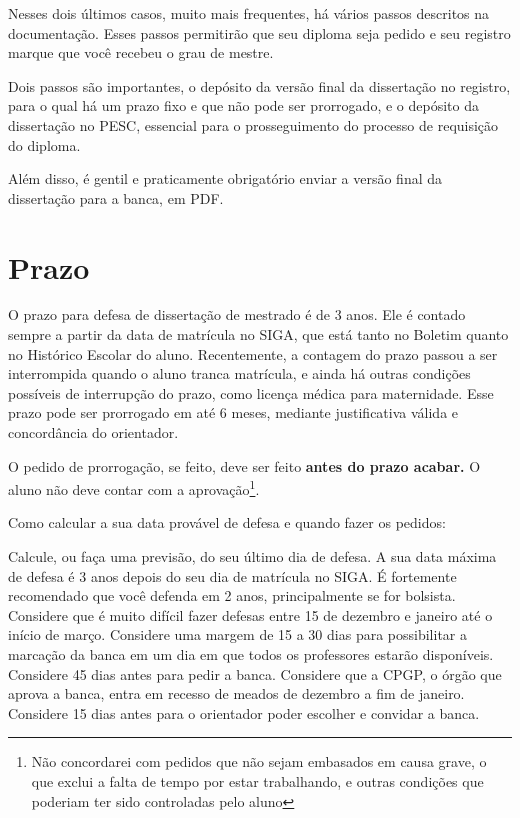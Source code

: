 Nesses dois últimos casos, muito mais frequentes, há vários passos descritos na documentação. Esses passos permitirão que seu diploma seja pedido e seu registro marque que você recebeu o grau de mestre.

Dois passos são importantes, o depósito da versão final da dissertação no registro, para o qual há um prazo fixo e que não pode ser prorrogado, e o depósito da dissertação no PESC, essencial para o prosseguimento do processo de requisição do diploma.

Além disso, é gentil e praticamente obrigatório enviar a versão final da dissertação para a banca, em PDF.


\section{Prazo}

O prazo para defesa de dissertação de mestrado é de 3 anos. Ele é contado sempre a partir da data de matrícula no SIGA, que está tanto no Boletim quanto no Histórico Escolar do aluno. Recentemente, a contagem do prazo passou a ser interrompida quando o aluno tranca matrícula, e ainda há outras condições possíveis de interrupção do prazo, como licença médica para maternidade. Esse prazo pode ser prorrogado em até 6 meses, mediante justificativa válida e concordância do orientador.

O pedido de prorrogação, se feito, deve ser feito \textbf{antes do prazo acabar.} O aluno não deve contar com a aprovação\footnote{Não concordarei com pedidos que não sejam embasados em causa grave, o que exclui a falta de tempo por estar trabalhando, e outras condições que poderiam ter sido controladas pelo aluno}.


Como calcular a sua data provável de defesa e quando fazer os pedidos:
\begin{outline}
    \1 Calcule, ou faça uma previsão, do seu último dia de defesa.
    \2 A sua data máxima de defesa é 3 anos depois do seu dia de matrícula no SIGA.
    \2 É fortemente recomendado que você defenda em 2 anos, principalmente se for bolsista.
    \1 Considere que é muito difícil fazer defesas entre 15 de dezembro e janeiro até o início de março.
    \1 Considere uma margem de 15 a 30 dias para possibilitar a marcação da banca em um dia em que todos os professores estarão disponíveis.
    \1 Considere 45 dias antes para pedir a banca.
    \2 Considere que a CPGP, o órgão que aprova a banca, entra em recesso de meados de dezembro a fim de janeiro.
    \1 Considere 15 dias antes para o orientador poder escolher e convidar a banca.
\end{outline}


